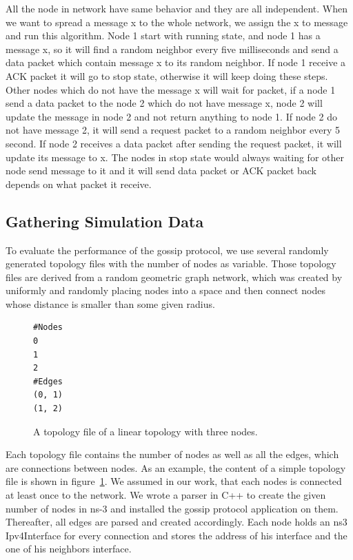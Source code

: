 \documentclass[12pt,journal]{IEEEtran}
\begin{document}
All the node in network have same behavior and they are all independent. When we want to spread a message x to the whole network, we assign the x to message and run this algorithm. Node 1 start with running state, and node 1 has a message x, so it will find a random neighbor every five milliseconds and send a data packet which contain message x to its random neighbor. If node 1 receive a ACK packet it will go to stop state, otherwise it will keep doing these steps. Other nodes which do not have the message x will wait for packet, if a node 1 send a data packet to the node 2 which do not have message x, node 2 will update the message in node 2 and not return anything to node 1. If node 2 do not have message 2, it will send a request packet to a random neighbor every 5 second. If node 2 receives a data packet after sending the request packet, it will update its message to x. The nodes in stop state would always waiting for other node send message to it and it will send data packet or ACK packet back depends on what packet it receive.

\subsection{Gathering Simulation Data}

To evaluate the performance of the gossip protocol, we use several randomly generated topology files with the number of nodes as variable. Those topology files are derived from a random geometric graph network, which was created by uniformly and randomly placing nodes into a space and then connect nodes whose distance is smaller than some given radius.

\begin{figure}
 \centering
 \begin{Verbatim}[fontsize=\small]
#Nodes
0
1
2
#Edges
(0, 1)
(1, 2)
\end{Verbatim}
 \caption{A topology file of a linear topology with three nodes.}
 \label{fig:topsimple}
\end{figure}


Each topology file contains the number of nodes as well as all the edges, which are connections between nodes. As an example, the content of a simple topology file is shown in figure~\ref{fig:topsimple}. We assumed in our work, that each nodes is connected at least once to the network. We wrote a parser in C++ to create the given number of nodes in ns-3 and installed the gossip protocol application on them. Thereafter, all edges are parsed and created accordingly. Each node holds an ns3 Ipv4Interface for every connection and stores the address of his interface and the one of his neighbors interface.
\end{document}
